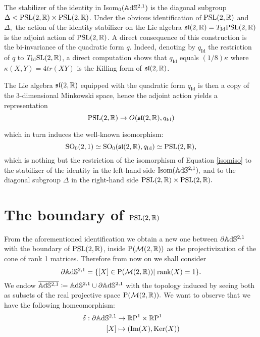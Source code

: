 The stabilizer of the identity in Isom$_0(\mathbb{A}\mathrm{d}\mathbb{S}^{2,1})$ is the diagonal subgroup $\Delta<\text{PSL}(2,\mathbb{R})\times\text{PSL}(2,\mathbb{R})$. Under the obvious identification of $\text{PSL}(2,\mathbb{R})$ and $\Delta,$ the action of the identity stabilizer on the Lie algebra $\mathfrak{sl}(2,\mathbb{R})=T_{\text{Id}}\text{PSL}(2,\mathbb{R})$ is the adjoint action of $\text{PSL}(2,\mathbb{R})$. A direct consequence of this construction is the bi-invariance of the quadratic form $q$. Indeed, denoting by $q_{\text{Id}}$ the restriction of $q$ to $T_{\text{Id}}\text{SL}(2,\mathbb{R})$, a direct computation shows that $q_\text{Id}$ equals $(1/8)\kappa$ where $\kappa(X,Y)=4tr(XY)$ is the Killing form of $\mathfrak{sl}(2, \mathbb{R})$.

\begin{observation}\label{311}
    The Lie algebra $\mathfrak{sl}(2,\mathbb{R})$ equipped with the quadratic form $q_{\text{Id}}$ is then a copy of the 3-dimensional Minkowski space, hence the adjoint action yields a representation 
    \[
        \text{PSL}(2,\mathbb{R})\to O(\mathfrak{sl}(2,\mathbb{R}),q_{\text{Id}})
    \]

which in turn induces the well-known isomorphism: 
\[
    \text{SO}_0(2,1)\simeq\text{SO}_0(\mathfrak{sl}(2,\mathbb{R}), q_\text{Id})\simeq \text{PSL}(2,\mathbb{R}),
\] which is nothing but the restriction of the isomorphism of Equation \ref{isomiso} to the stabilizer of the identity in the left-hand side $\text{Isom}(\mathbb{A}\mathrm{d}\mathbb{S}^{2,1}),$ and to the diagonal subgroup $\Delta$ in the right-hand side $\text{PSL}(2,\mathbb{R})\times\text{PSL}(2,\mathbb{R}).$
\end{observation}

\section{The boundary of $\text{PSL}(2,\mathbb{R})$} 
From the aforementioned identification we obtain a new one between $\partial\mathbb{A}\mathrm{d}\mathbb{S}^{2,1}$ with the boundary of $\text{PSL}(2,\mathbb{R})$, inside $\text{P}(\mathcal{M}(2,\mathbb{R}))$ as the projectivization of the cone of rank 1 matrices. Therefore from now on we shall consider 
\[
    \partial\mathbb{A}\mathrm{d}\mathbb{S}^{2,1}=\{[X]\in\text{P}(\mathcal{M}(2,\mathbb{R}))|\;\text{rank}(X)=1\}.
\]
We endow $\overline{\mathbb{A}\mathrm{d}\mathbb{S}^{2,1}}\coloneqq \mathbb{A}\mathrm{d}\mathbb{S}^{2,1}\cup\partial\mathbb{A}\mathrm{d}\mathbb{S}^{2,1}$ with the topology induced by seeing both as subsets of the real projective space $\text{P}(\mathcal{M}(2,\mathbb{R})).$ We want to observe that we have the following homeomorphism: 
\begin{align*}\label{delta}
    \delta:\partial\mathbb{A}\mathrm{d}\mathbb{S}^{2,1}&\rightarrow\mathbb{R}\text{P}^1\times\mathbb{R}\text{P}^1\\
    [X]&\mapsto (\text{Im}(X),\text{Ker}(X))
\end{align*}


